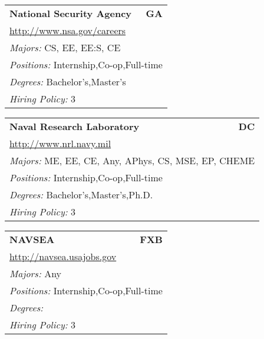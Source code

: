 \documentclass[twoside]{article}
\begin{document}
\begin{center}
\begin{multicols}{3}
\begin{FlushLeft}
\begin{minipage}{.9\columnwidth}
\end{minipage}
 
\begin{minipage}{.9\columnwidth}\begin{tabularx}{.95\columnwidth}{Xr}
                 {\Large\bf National Security Agency} & {\Large\bf GA}\\
    \multicolumn{2}{p{.95\columnwidth}}{\url{http://www.nsa.gov/careers}}\\
    \multicolumn{2}{p{.95\columnwidth}}{\emph{Majors:} CS, EE, EE:S, CE}\\
    \multicolumn{2}{p{.95\columnwidth}}{\emph{Positions:} Internship,Co-op,Full-time}\\
    \multicolumn{2}{p{.95\columnwidth}}{\emph{Degrees:} Bachelor's,Master's}\\
    \multicolumn{2}{p{.95\columnwidth}}{\emph{Hiring Policy:} 3}\\
    \end{tabularx}
    
\end{minipage}
 
\begin{minipage}{.9\columnwidth}\begin{tabularx}{.95\columnwidth}{Xr}
                 {\Large\bf Naval Research Laboratory} & {\Large\bf DC}\\
    \multicolumn{2}{p{.95\columnwidth}}{\url{http://www.nrl.navy.mil}}\\
    \multicolumn{2}{p{.95\columnwidth}}{\emph{Majors:} ME, EE, CE, Any, APhys, CS, MSE, EP, CHEME}\\
    \multicolumn{2}{p{.95\columnwidth}}{\emph{Positions:} Internship,Co-op,Full-time}\\
    \multicolumn{2}{p{.95\columnwidth}}{\emph{Degrees:} Bachelor's,Master's,Ph.D.}\\
    \multicolumn{2}{p{.95\columnwidth}}{\emph{Hiring Policy:} 3}\\
    \end{tabularx}
    
\end{minipage}
 
\begin{minipage}{.9\columnwidth}\begin{tabularx}{.95\columnwidth}{Xr}
                 {\Large\bf NAVSEA} & {\Large\bf FXB}\\
    \multicolumn{2}{p{.95\columnwidth}}{\url{http://navsea.usajobs.gov}}\\
    \multicolumn{2}{p{.95\columnwidth}}{\emph{Majors:} Any}\\
    \multicolumn{2}{p{.95\columnwidth}}{\emph{Positions:} Internship,Co-op,Full-time}\\
    \multicolumn{2}{p{.95\columnwidth}}{\emph{Degrees:} }\\
    \multicolumn{2}{p{.95\columnwidth}}{\emph{Hiring Policy:} 3}\\
    \end{tabularx}
    

\end{minipage}
\end{FlushLeft}
\end{multicols}
\end{center}
\end{document}
